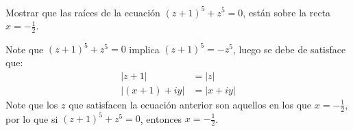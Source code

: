 \begin{homeworkProblem}
  Mostrar que las raíces de la ecuación $(z+1)^5 + z^5 = 0$, están sobre la recta $x=-\frac{1}{2}$.
  \begin{solution}
    Note que $(z+1)^{5}+z^5=0$ implica $(z+1)^5=-z^5$, luego se debe de satisface que:
    \begin{align*}
      |z+1|&=|z|\\
      |(x+1)+iy|&=|x+iy|
    \end{align*}
    Note que los $z$ que satisfacen la ecuación anterior son aquellos en los que $x=-\frac{1}{2}$, por lo que si $(z+1)^{5}+z^{5}=0$, entonces $x=-\frac{1}{2}$.
  \end{solution}
\end{homeworkProblem}
